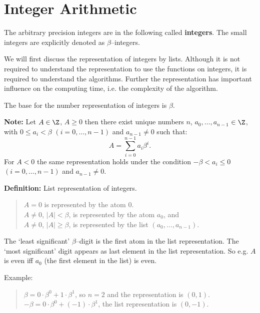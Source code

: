 \section{Integer Arithmetic}

The arbitrary precision integers are in the following 
called {\bf integers}. The small integers are explicitly
denoted as $\beta$--integers. 

We will first discuss the representation of integers by
lists. Although it is not required to understand 
the representation to use the functions on integers, 
it is required to understand the algorithms.
Further the representation has important influence 
on the computing time, i.e. the complexity of
the algorithm. 

The base for the number representation of integers 
is $\beta$.

{\bf Note:} 
Let $A \in \Z$, $A \geq 0$ then there
exist unique numbers $n$, $a_0, \ldots, a_{n-1}$ $\in \Z$,
with $0 \leq a_i < \beta$ $(i=0, \ldots, n-1)$ 
and $a_{n-1} \neq 0$ such that:
\begin{displaymath}
       A = \sum_{i=0}^{n-1} a_i \beta^i.
\end{displaymath}
For $A < 0$ the same representation
holds under the condition 
$-\beta < a_i \leq 0$ $(i=0, \ldots, n-1)$ 
and $a_{n-1} \neq 0$.


{\bf Definition:} List representation of integers.
\begin{quote}
       $A = 0$ is represented by the atom $0$.
       \\
       $A \neq 0$, $\vert A \vert < \beta$, is represented 
       by the atom $a_0$, and 
       \\
       $A \neq 0$, $\vert A \vert \geq \beta$, is represented 
       by the list 
       $(a_0, \ldots, a_{n-1})$.
\end{quote}
The `least significant' $\beta$--digit is the first atom 
in the list representation. The `most significant' 
digit appears as last element in the list representation.
So e.g. $A$ is even iff $a_0$ (the first element in the list)
is even. 

Example: 
\begin{quote}
      $\beta = 0 \cdot \beta^0 + 1 \cdot \beta^1$, so $n = 2$ and 
      the representation is $(0,1)$. 
      \\
      $-\beta = 0 \cdot \beta^0 + (-1) \cdot \beta^1$, 
      the list representation is $(0,-1)$. 
\end{quote}


